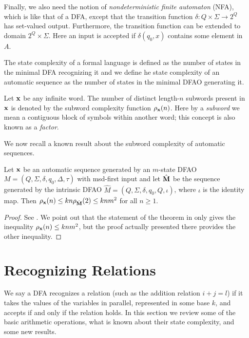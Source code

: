 \documentclass[12pt,reqno]{article}
\begin{document}
Finally, we also need the notion of {\it nondeterministic finite
automaton} (NFA), which is like that of a DFA, except that the transition
function $\delta: Q \times \Sigma \rightarrow 2^Q$ has set-valued output. Furthermore, the transition function can be extended to domain $2^Q \times \Sigma$. Here an input is accepted if
$\delta(q_0,x)$ contains some element in $A$.

The state complexity of a formal language is defined as the number of states in the minimal DFA recognizing it and we define he state complexity of an automatic sequence as the number of states in the minimal DFAO generating it.


Let $\bf x$ be any infinite word. The number of distinct length-$n$ subwords present in ${\bf x}$ is denoted by the subword complexity function $\rho_{\bf x}(n)$. Here by a {\it subword} we mean a contiguous block of symbols within another word; this concept is also known as a {\it factor}.

We now recall a known result about the subword complexity of automatic sequences.
\sloppy
\begin{theorem} \label{theorem:subword-complexity}
Let ${\bf x}$ be an automatic sequence generated by an $m$-state DFAO $M = (Q, \Sigma, \delta, q_0, \Delta, \tau)$ with msd-first input and let $\hat{\bf M}$ be the sequence generated by the intrinsic DFAO
$\hat{M}=(Q, \Sigma, \delta, q_0, Q, \iota)$, where $\iota$ is the identity map.
Then $\rho_{\bf x} (n) \leq k n  \rho_{\hat{\bf M}} (2) \leq kn m^2$ for all $n \geq 1$. 
\end{theorem}

\begin{proof}
See \cite[Theorem 10.3.1]{allouche_automatic_2003}.  We point out that the statement of the theorem in \cite{allouche_automatic_2003} only gives the inequality $\rho_{\bf x} (n) \leq kn m^2$, but the proof  actually presented there provides the other inequality.
\end{proof}



\section{Recognizing Relations} \label{section:relations}

We say a DFA recognizes a relation (such as the addition relation $i + j = l$) if it takes the values of the variables in parallel, represented in some base $k$, 
and accepts if and only if the relation holds.  In this section we review some of the basic arithmetic operations, what is known about their state complexity, and some new results.
\end{document}
